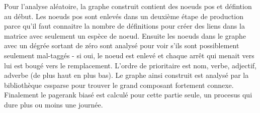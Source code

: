 Pour l'analyse aléatoire, la graphe construit contient des noeuds pos et défintion au début.
Les noeuds pos sont enlevés dans un deuxième étape de production parce qu'il faut connaitre
la nombre de définitions pour créer des liens dans la matrice avec seulement un espèce de noeud.
Ensuite les noeuds dans le graphe avec un dégrée sortant de zéro sont analysé pour voir s'ils
sont possiblement seulement mal-taggés - si oui, le noeud est enlevé et chaque arrêt qui menait
vers lui est bougé vers le remplacement. L'ordre de prioritaire est nom, verbe, adjectif, adverbe
(de plus haut en plus bas). Le graphe ainsi construit est analysé par la bibliothèque cssparse
pour trouver le grand composant fortement connexe. Finalement le pagerank biasé est calculé
pour cette partie seule, un procesus qui dure plus ou moins une journée. 




